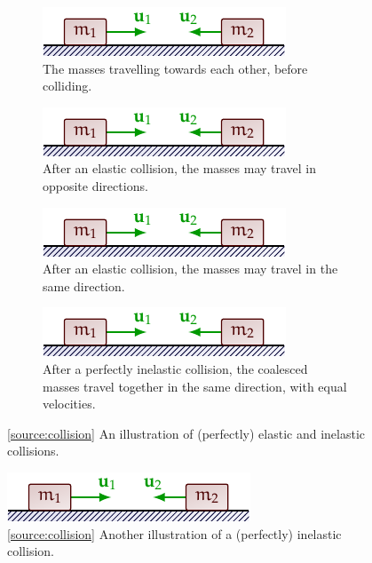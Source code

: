 \documentclass[oneside]{book}
\begin{document}
\begin{figure}[H]
    \centering
    \begin{subfigure}[c]{\textwidth}
        \centering
        \includegraphics[page=1]{../images/collisions/collisions.pdf}
        \caption{The masses travelling towards each other, before colliding.}
    \end{subfigure}%

    \vspace{1em}
    \begin{subfigure}[c]{0.4\textwidth}
        \centering
        \includegraphics[page=2]{../images/collisions/collisions.pdf}
        \caption{After an elastic collision, the masses may travel in opposite directions.}
    \end{subfigure}\hfill
    \begin{subfigure}[c]{0.5\textwidth}
        \centering
        \includegraphics[page=3]{../images/collisions/collisions.pdf}
        \caption{After an elastic collision, the masses may travel in the same direction.}
    \end{subfigure}%

    \vspace{1em}
    \begin{subfigure}[c]{\textwidth}
        \centering
        \includegraphics[page=4]{../images/collisions/collisions.pdf}
        \caption{After a perfectly inelastic collision, the coalesced masses travel together in the same direction, with equal velocities.}
    \end{subfigure}%
    \caption{\ref{source:collision} An illustration of (perfectly) elastic and inelastic collisions.}
    \label{fig:collision-1d}
\end{figure}
\begin{figure}[H]
    \centering
    \includegraphics[page=7]{../images/collisions/collisions.pdf}
    \caption{\ref{source:collision} Another illustration of a (perfectly) inelastic collision.}
    \label{fig:collision-2d}
\end{figure}
\end{document}
